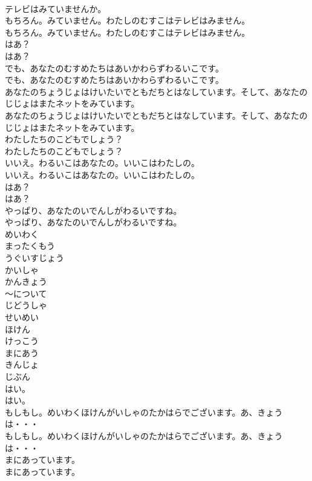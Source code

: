 \documentclass[8pt]{extreport}
\begin{document}
\begin{CJK}{UTF8}{min}
\\	テレビはみていませんか。 
\\	もちろん。みていません。わたしのむすこはテレビはみません。	
\\	もちろん。みていません。わたしのむすこはテレビはみません。 
\\	はあ？	
\\	はあ？ 
\\	でも、あなたのむすめたちはあいかわらずわるいこです。	
\\	でも、あなたのむすめたちはあいかわらずわるいこです。 
\\	あなたのちょうじょはけいたいでともだちとはなしています。そして、あなたのじじょはまたネットをみています。	
\\	あなたのちょうじょはけいたいでともだちとはなしています。そして、あなたのじじょはまたネットをみています。 
\\	わたしたちのこどもでしょう？	
\\	わたしたちのこどもでしょう？ 
\\	いいえ。わるいこはあなたの。いいこはわたしの。	
\\	いいえ。わるいこはあなたの。いいこはわたしの。 
\\	はあ？	
\\	はあ？ 
\\	やっぱり、あなたのいでんしがわるいですね。	
\\	やっぱり、あなたのいでんしがわるいですね。 
\\	めいわく
\\	まったくもう
\\	うぐいすじょう
\\	かいしゃ
\\	かんきょう
\\	〜について
\\	じどうしゃ
\\	せいめい
\\	ほけん
\\	けっこう
\\	まにあう
\\	きんじょ
\\	じぶん
\\	はい。	
\\	はい。 
\\	もしもし。めいわくほけんがいしゃのたかはらでございます。あ、きょうは・・・	
\\	もしもし。めいわくほけんがいしゃのたかはらでございます。あ、きょうは・・・ 
\\	まにあっています。	
\\	まにあっています。 

\end{CJK}
\end{document}
